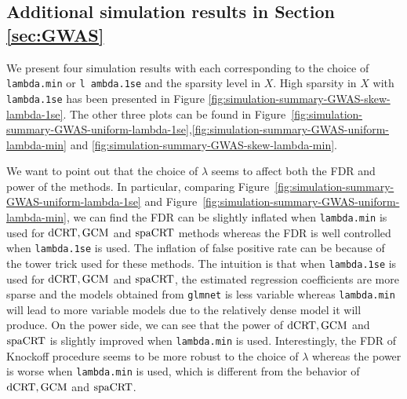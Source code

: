 \documentclass[12pt]{article}
\theoremstyle{definition}
\newcommand{\dCRT}{\textnormal{dCRT}} 					%
\newcommand{\GCM}{\textnormal{GCM}}						%
\newcommand{\spacrt}{\textnormal{spaCRT}}               %
\begin{document}
\subsection{Additional simulation results in Section \ref{sec:GWAS}}\label{sec:simulation_results_GWAS}

We present four simulation results with each corresponding to the choice of \texttt{lambda.min} or \texttt{l
ambda.1se} and the sparsity level in $X$. High sparsity in $X$ with \texttt{lambda.1se} has been presented in Figure \ref{fig:simulation-summary-GWAS-skew-lambda-1se}. The other three plots can be found in Figure~\ref{fig:simulation-summary-GWAS-uniform-lambda-1se},\ref{fig:simulation-summary-GWAS-uniform-lambda-min} and \ref{fig:simulation-summary-GWAS-skew-lambda-min}.

We want to point out that the choice of $\lambda$ seems to affect both the FDR and power of the methods. In particular, comparing Figure~\ref{fig:simulation-summary-GWAS-uniform-lambda-1se} and Figure~\ref{fig:simulation-summary-GWAS-uniform-lambda-min}, we can find the FDR can be slightly inflated when \texttt{lambda.min} is used for $\dCRT,\GCM$ and $\spacrt$ methods whereas the FDR is well controlled when \texttt{lambda.1se} is used. The inflation of false positive rate can be because of the tower trick used for these methods. The intuition is that when \texttt{lambda.1se} is used for $\dCRT,\GCM$ and $\spacrt$, the estimated regression coefficients are more sparse and the models obtained from \texttt{glmnet} is less variable whereas \texttt{lambda.min} will lead to more variable models due to the relatively dense model it will produce. On the power side, we can see that the power of $\dCRT,\GCM$ and $\spacrt$ is slightly improved when \texttt{lambda.min} is used. Interestingly, the FDR of Knockoff procedure seems to be more robust to the choice of $\lambda$ whereas the power is worse when \texttt{lambda.min} is used, which is different from the behavior of $\dCRT,\GCM$ and $\spacrt$. 
\end{document}

